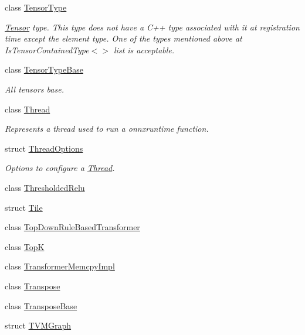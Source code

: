 \begin{DoxyCompactItemize}
\item 
class \mbox{\hyperlink{classonnxruntime_1_1TensorType}{Tensor\+Type}}
\begin{DoxyCompactList}\small\item\em \mbox{\hyperlink{classonnxruntime_1_1Tensor}{Tensor}} type. This type does not have a C++ type associated with it at registration time except the element type. One of the types mentioned above at Is\+Tensor\+Contained\+Type$<$$>$ list is acceptable. \end{DoxyCompactList}\item 
class \mbox{\hyperlink{classonnxruntime_1_1TensorTypeBase}{Tensor\+Type\+Base}}
\begin{DoxyCompactList}\small\item\em All tensors base. \end{DoxyCompactList}\item 
class \mbox{\hyperlink{classonnxruntime_1_1Thread}{Thread}}
\begin{DoxyCompactList}\small\item\em Represents a thread used to run a onnxruntime function. \end{DoxyCompactList}\item 
struct \mbox{\hyperlink{structonnxruntime_1_1ThreadOptions}{Thread\+Options}}
\begin{DoxyCompactList}\small\item\em Options to configure a \mbox{\hyperlink{classonnxruntime_1_1Thread}{Thread}}. \end{DoxyCompactList}\item 
class \mbox{\hyperlink{classonnxruntime_1_1ThresholdedRelu}{Thresholded\+Relu}}
\item 
struct \mbox{\hyperlink{structonnxruntime_1_1Tile}{Tile}}
\item 
class \mbox{\hyperlink{classonnxruntime_1_1TopDownRuleBasedTransformer}{Top\+Down\+Rule\+Based\+Transformer}}
\item 
class \mbox{\hyperlink{classonnxruntime_1_1TopK}{TopK}}
\item 
class \mbox{\hyperlink{classonnxruntime_1_1TransformerMemcpyImpl}{Transformer\+Memcpy\+Impl}}
\item 
class \mbox{\hyperlink{classonnxruntime_1_1Transpose}{Transpose}}
\item 
class \mbox{\hyperlink{classonnxruntime_1_1TransposeBase}{Transpose\+Base}}
\item 
struct \mbox{\hyperlink{structonnxruntime_1_1TVMGraph}{T\+V\+M\+Graph}}
\item 

\end{DoxyCompactItemize}
